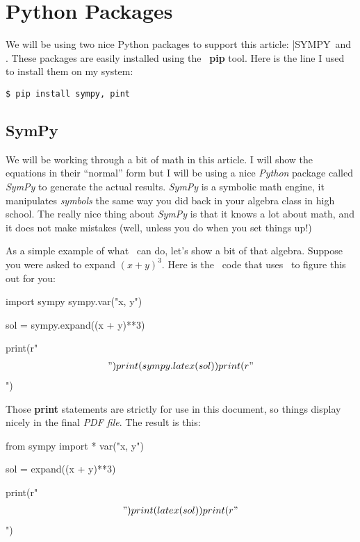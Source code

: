 \section{Python Packages}

We will be using two nice Python packages to support this article: |SYMPY\ and \PINT. These
packages are easily installed using the \PY\ {\bf pip} tool. Here is the line I
used to install them on my system:

\begin{Verbatim}[frame=single]
$ pip install sympy, pint
\end{Verbatim}

\subsection{SymPy}

We will be working through a bit of math in this article. I will show the
equations in their ``normal'' form but I will be using a nice {\it Python} package
called {\it SymPy} to generate the actual results. {\it SymPy} is a symbolic
math engine, it manipulates {\it symbols} the same way you did back in your
algebra class in high school. The really nice thing about {\it SymPy} is that
it knows a lot about math, and it does not make mistakes (well, unless you do
when you set things up!)

As a simple example of what \SYMPY\ can do, let's show a bit of that algebra.
Suppose you were asked to expand $(x + y)^3$. Here is the \PY\ code that uses
\SYMPY\ to figure this out for you:

\begin{pyblock}
import sympy
sympy.var("x, y")

sol = sympy.expand((x + y)**3)

print(r"\begin{align*}")
print(sympy.latex(sol))
print(r"\end{align*}")
\end{pyblock}

Those {\bf print} statements are strictly for use in this document, so things
display nicely in the final {\it PDF file}. The result is this:

\begin{pycode}
from sympy import *
var("x, y")

sol = expand((x + y)**3)

print(r"\begin{align*}")
print(latex(sol))
print(r"\end{align*}")
\end{pycode}

